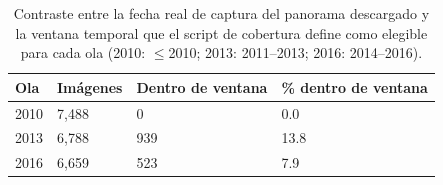 \begin{table}
\caption{Contraste entre la fecha real de captura del panorama descargado y la ventana temporal que el script de cobertura define como elegible para cada ola (2010: $\leq$2010; 2013: 2011--2013; 2016: 2014--2016).}
\label{tab:gsv_ventana_temporal}
\begin{tabular}{llll}
\toprule
Ola & Imágenes & Dentro de ventana & \% dentro de ventana \\
\midrule
2010 & 7,488 & 0 & 0.0 \\
2013 & 6,788 & 939 & 13.8 \\
2016 & 6,659 & 523 & 7.9 \\
\bottomrule
\end{tabular}
\end{table}
